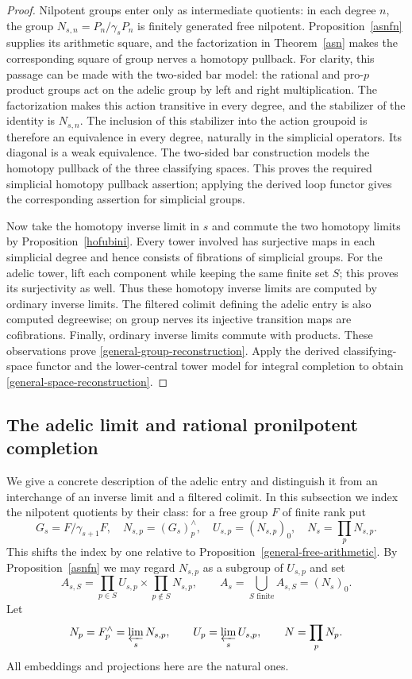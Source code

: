 \documentclass[11pt,a4paper]{article}
\begin{document}
\begin{proof}
Nilpotent groups enter only as intermediate quotients: in each degree
$n$, the group $N_{s,n}=P_n/\gamma_sP_n$ is finitely generated free
nilpotent.  Proposition~\ref{asnfn} supplies its arithmetic square,
and the factorization in Theorem~\ref{asn} makes the corresponding
square of group nerves a homotopy pullback.  For clarity, this passage can be made with the two-sided bar model:
the rational and pro-$p$ product groups act on the adelic group by
left and right multiplication.  The factorization makes this action
transitive in every degree, and the stabilizer of the identity is
$N_{s,n}$.  The inclusion of this stabilizer into the action groupoid
is therefore an equivalence in every degree, naturally in the
simplicial operators.  Its diagonal is a weak equivalence.  The
two-sided bar construction models the homotopy pullback of the three
classifying spaces.  This proves the required simplicial homotopy
pullback assertion; applying the derived loop functor gives the
corresponding assertion for simplicial groups.

Now take the homotopy inverse limit in $s$ and commute the two homotopy
limits by Proposition~\ref{hofubini}.  Every tower involved has
surjective maps in each simplicial degree and hence consists of
fibrations of simplicial groups.  For the adelic tower, lift each
component while keeping the same finite set $S$; this proves its
surjectivity as well.  Thus these homotopy inverse limits are computed
by ordinary inverse limits.  The filtered colimit defining the adelic
entry is also computed degreewise; on group nerves its injective
transition maps are cofibrations.  Finally, ordinary inverse limits
commute with products.  These observations prove
\eqref{general-group-reconstruction}.  Apply the derived classifying-space
functor and the lower-central tower model for integral completion
\cite[Chapter~IV]{BK} to obtain \eqref{general-space-reconstruction}.
\end{proof}

\subsection{The adelic limit and rational pronilpotent completion}
\label{adelic-explicit}
We give a concrete description of the adelic entry and distinguish it
from an interchange of an inverse limit and a filtered colimit.  In this
subsection we index the nilpotent quotients by their class: for a free
group $F$ of finite rank put
\[
 G_s=F/\gamma_{s+1}F,\quad N_{s,p}=(G_s)_p^{\wedge},\quad
 U_{s,p}=(N_{s,p})_0,\quad N_s=\prod_pN_{s,p}.
\]
This shifts the index by one relative to
Proposition~\ref{general-free-arithmetic}.  By Proposition~\ref{asnfn}
we may regard $N_{s,p}$ as a subgroup of $U_{s,p}$ and set
\[
 A_{s,S}=\prod_{p\in S}U_{s,p}\times\prod_{p\notin S}N_{s,p},
 \qquad A_s=\bigcup_{S\text{ finite}}A_{s,S}=(N_s)_0.
\]
Let
\[
 N_p=F_p^{\wedge}=\varprojlim_sN_{s,p},\qquad
 U_p=\varprojlim_sU_{s,p},\qquad N=\prod_pN_p.
\]
All embeddings and projections here are the natural ones.
\end{document}
